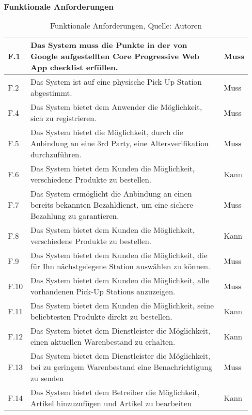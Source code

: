 \subsubsection{Funktionale Anforderungen}
\begin{table}[H]
	\setlength\extrarowheight{2pt} %
	\begin{tabularx}{\textwidth}{|l|X|l|}
		\hline
		F.1 & Das System muss die Punkte in der von Google aufgestellten Core Progressive Web App checklist erfüllen. \cite{pwaChecklist} & Muss \\
		\hline
		F.2 & Das System ist auf eine physische Pick-Up Station abgestimmt. & Muss \\
		\hline
		F.4 & Das System bietet dem Anwender die Möglichkeit, sich zu registrieren. & Muss \\
		\hline
		F.5 & Das System bietet die Möglichkeit, durch die Anbindung an eine 3rd Party, eine Altersverifikation durchzuführen.  & Muss \\
		\hline
		F.6 & Das System bietet dem Kunden die Möglichkeit, verschiedene Produkte zu bestellen. & Kann \\
		\hline
		F.7 & Das System ermöglicht die Anbindung an einen bereits bekannten Bezahldienst, um eine sichere Bezahlung zu garantieren. & Muss \\
		\hline
		F.8 & Das System bietet dem Kunden die Möglichkeit, verschiedene Produkte zu bestellen. & Kann \\
		\hline
		F.9 & Das System bietet dem Kunden die Möglichkeit, die für Ihn nächstgelegene Station auswählen zu können.  & Muss \\
		\hline
		F.10 & Das System bietet dem Kunden die Möglichkeit, alle vorhandenen Pick-Up Stations anzuzeigen.  & Muss \\
		\hline
		F.11 & Das System bietet dem Kunden die Möglichkeit, seine beliebtesten Produkte direkt zu bestellen. & Kann \\
		\hline
		F.12 & Das System bietet dem Dienstleister die Möglichkeit, einen aktuellen Warenbestand zu erhalten. & Kann \\
		\hline
		F.13 & Das System bietet dem Dienstleister die Möglichkeit, bei zu geringem Warenbestand eine Benachrichtigung zu senden & Muss \\
		\hline
		F.14 & Das System bietet dem Betreiber die Möglichkeit, Artikel hinzuzufügen und Artikel zu bearbeiten & Kann \\
		\hline
		
		
	\end{tabularx}
	\caption{ \label{tbl: FunktionaleAnforderungent}Funktionale Anforderungen, Quelle: Autoren}
\end{table}
